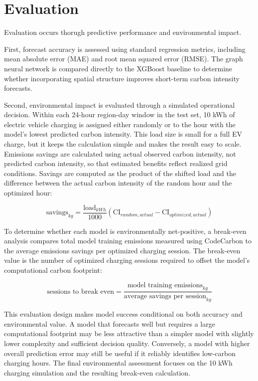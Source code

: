 \documentclass{article}
\begin{document}
\section{Evaluation}

Evaluation occurs thorugh predictive performance and environmental impact.

First, forecast accuracy is assessed using standard regression metrics, including mean absolute error (MAE) and root mean squared error (RMSE). The graph neural network is compared directly to the XGBoost baseline to determine whether incorporating spatial structure improves short-term carbon intensity forecasts.

Second, environmental impact is evaluated through a simulated operational decision. Within each 24-hour region-day window in the test set, 10 kWh of electric vehicle charging is assigned either randomly or to the hour with the model's lowest predicted carbon intensity. This load size is small for a full EV charge, but it keeps the calculation simple and makes the result easy to scale. Emissions savings are calculated using actual observed carbon intensity, not predicted carbon intensity, so that estimated benefits reflect realized grid conditions. Savings are computed as the product of the shifted load and the difference between the actual carbon intensity of the random hour and the optimized hour:

\begin{equation}
  \text{savings}_{kg} = \frac{\text{load}_{kWh}}{1000}
  \left(\text{CI}_{random,actual} - \text{CI}_{optimized,actual}\right)
\end{equation}

To determine whether each model is environmentally net-positive, a break-even analysis compares total model training emissions measured using CodeCarbon to the average emissions savings per optimized charging session. The break-even value is the number of optimized charging sessions required to offset the model's computational carbon footprint:

\begin{equation}
  \text{sessions to break even} =
  \frac{\text{model training emissions}_{kg}}{\text{average savings per session}_{kg}}
\end{equation}

This evaluation design makes model success conditional on both accuracy and environmental value. A model that forecasts well but requires a large computational footprint may be less attractive than a simpler model with slightly lower complexity and sufficient decision quality. Conversely, a model with higher overall prediction error may still be useful if it reliably identifies low-carbon charging hours. The final environmental assessment focuses on the 10 kWh charging simulation and the resulting break-even calculation.
\end{document}
